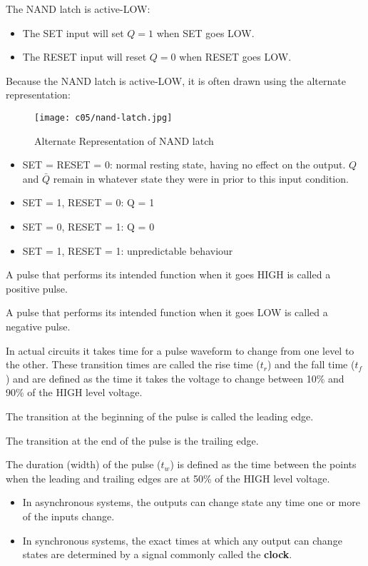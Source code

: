   \par The NAND latch is active-LOW:
  \begin{itemize}
    \item The SET input will set $Q = 1$ when SET goes LOW.
    \item The RESET input will reset $Q = 0$ when RESET goes LOW.
  \end{itemize}
  \par Because the NAND latch is active-LOW, it is often drawn using the alternate
  representation:
  \begin{figure}[H]
    \centering
    \texttt{[image: c05/nand-latch.jpg]}
    \caption{Alternate Representation of NAND latch}
  \end{figure}

  \begin{itemize}
    \item SET = RESET = 0: normal resting state, having no effect on the output.
    $Q$ and $\bar{Q}$ remain in whatever state they were in prior to this input
    condition.
    \item SET = 1, RESET = 0: Q = 1
    \item SET = 0, RESET = 1: Q = 0
    \item SET = 1, RESET = 1: unpredictable behaviour
  \end{itemize}

  \par A pulse that performs its intended function when it goes HIGH is called
  a positive pulse.
  \par A pulse that performs its intended function when it goes LOW is called
  a negative pulse.
  \par In actual circuits it takes time for a pulse waveform to change from one
  level to the other. These transition times are called the rise time ($t_{r}$) and
  the fall time ($t_{f}$) and are defined as the time it takes the voltage to change
  between 10\% and 90\% of the HIGH level voltage.
  \par The transition at the beginning of the pulse is called the leading edge.
  \par The transition at the end of the pulse is the trailing edge.
  \par The duration (width) of the pulse ($t_{w}$) is defined as the time between
  the points when the leading and trailing edges are at 50\% of the HIGH level voltage.

    \begin{itemize}
      \item In asynchronous systems, the outputs can change state any time one
        or more of the inputs change.
      \item In synchronous systems, the exact times at which any output can change
        states are determined by a signal commonly called the \textbf{clock}.
    \end{itemize}

